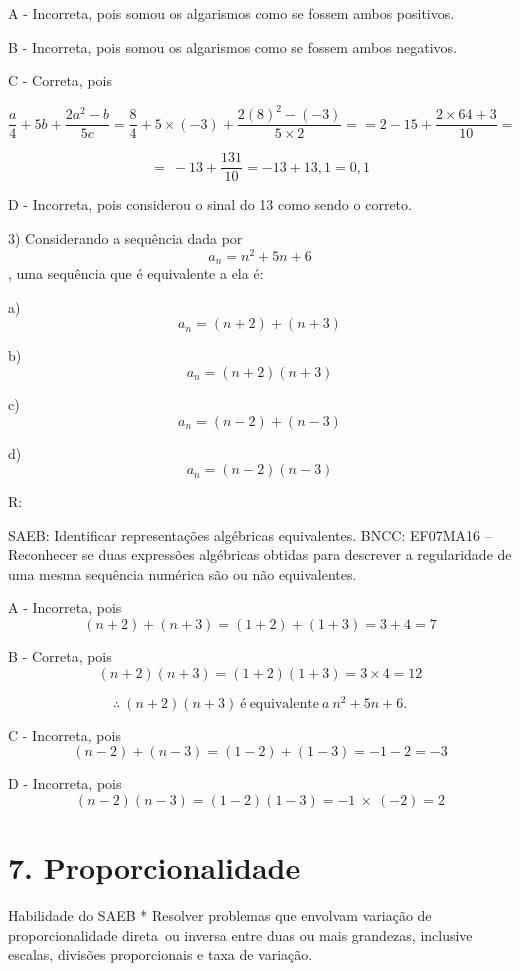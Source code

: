 A - Incorreta, pois somou os algarismos como se fossem ambos positivos.

B - Incorreta, pois somou os algarismos como se fossem ambos negativos.

C - Correta, pois

\[\frac{a}{4} + 5b + \frac{2a^{2} - b}{5c} = \frac{8}{4} + 5 \times \left( - 3 \right) + \frac{2\left( 8 \right)^{2} - \left( - 3 \right)}{5 \times 2} = = 2 - 15 + \frac{2 \times 64 + 3}{10} =\]

\[= \  - 13 + \frac{131}{10} = - 13 + 13,1 = 0,1\]

D - Incorreta, pois considerou o sinal do 13 como sendo o correto.

3) Considerando a sequência dada por \[a_{n} = n^{2} + 5n + 6\], uma
sequência que é equivalente a ela é:

a) \[a_{n} = (n + 2) + (n + 3)\]

b) \[a_{n} = (n + 2)(n + 3)\]

c) \[a_{n} = (n - 2) + (n - 3)\]

d) \[a_{n} = (n - 2)(n - 3)\]

R:

SAEB: Identificar representações algébricas equivalentes. BNCC: EF07MA16
-- Reconhecer se duas expressões algébricas obtidas para descrever a
regularidade de uma mesma sequência numérica são ou não equivalentes.

A - Incorreta, pois
\[\left( n + 2 \right) + \left( n + 3 \right) = \left( 1 + 2 \right) + \left( 1 + 3 \right) = 3 + 4 = 7\]

B - Correta, pois
\[\left( n + 2 \right)\left( n + 3 \right) = \left( 1 + 2 \right)\left( 1 + 3 \right) = 3 \times 4 = 12\]

\[\therefore\ \left( n + 2 \right)\left( n + 3 \right)\ é\ \text{equivalente}\ a\ n^{2} + 5n + 6.\]

C - Incorreta, pois
\[\left( n - 2 \right) + \left( n - 3 \right) = \left( 1 - 2 \right) + \left( 1 - 3 \right) = - 1 - 2 = - 3\]

D - Incorreta, pois
\[\left( n - 2 \right)\left( n - 3 \right) = \left( 1 - 2 \right)\left( 1 - 3 \right) = - 1\  \times \ ( - 2) = 2\]

\hypertarget{proporcionalidade}{%
\section{7. Proporcionalidade}\label{proporcionalidade}}

Habilidade do SAEB * Resolver problemas que envolvam variação de
proporcionalidade direta~ou inversa entre duas ou mais grandezas,
inclusive escalas, divisões proporcionais e taxa de variação.

